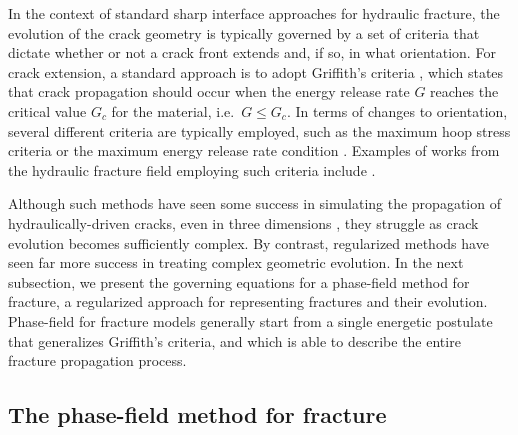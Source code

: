 In the context of standard sharp interface approaches for hydraulic fracture, the evolution of the crack geometry is typically governed by a set of criteria that dictate whether or not a crack front extends and, if so, in what orientation.  For crack extension, a standard approach is to adopt Griffith's criteria \cite{griffith1921vi}, which states that crack propagation should occur when the energy release rate $G$ reaches the critical value $G_c$ for the material, i.e.\ $G \le G_c$.   In terms of changes to orientation, several different criteria are typically employed, such as the maximum hoop stress criteria \cite{10.1115/1.3656897, williams1972fracture, finnie1973note} or the maximum energy release rate condition \cite{ewing1976further, cotterell1965brittle, hussain1974strain}. Examples of works from the hydraulic fracture field employing such criteria include \cite{he2018modeling, jang2020analysis, grossman2019algorithm}. 

Although such methods have seen some success in simulating the propagation of hydraulically-driven cracks, even in three dimensions \cite{gupta2014simulation, gupta2018coupled,shauer2022three}, they struggle as crack evolution becomes sufficiently complex.  By contrast, regularized methods have seen far more success in treating complex geometric evolution. In the next subsection, we present the governing equations for a phase-field method for fracture, a regularized approach for representing fractures and their evolution.  Phase-field for fracture models generally start from a single energetic postulate that generalizes Griffith's criteria, and which is able to describe the entire fracture propagation process.

\subsection{The phase-field method for fracture}
\label{sec:pfm-fracture}

